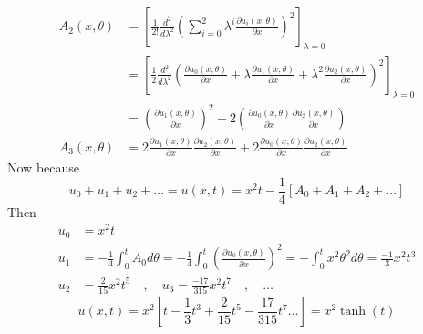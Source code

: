 \begin{example}
\begin{align*}
        \\
        A_2(x,\theta) & =\left[\frac{1}{2!} \frac{d^2}{d \lambda^2} \left(\sum_{i=0}^{2}  \lambda^i \frac{\partial u_i(x,\theta)}{\partial x}\right)^2\right]_{\lambda = 0}
        \\
                      & = \left[\frac{1}{2} \frac{d^2}{d \lambda^2} \left(\frac{\partial u_0(x,\theta)}{\partial x} + \lambda \frac{\partial u_1(x,\theta)}{\partial x} + \lambda^2 \frac{\partial u_2(x,\theta)}{\partial x}\right)^2\right]_{\lambda = 0}
        \\
                      & = \left(\frac{\partial u_1(x,\theta)}{\partial x}\right)^2 + 2 \left(\frac{\partial u_0(x,\theta)}{\partial x}\frac{\partial u_2(x,\theta)}{\partial x}\right)
        \\
        A_3(x,\theta) & = 2\frac{\partial u_1(x,\theta)}{\partial x}\frac{\partial u_2(x,\theta)}{\partial x} + 2\frac{\partial u_0(x,\theta)}{\partial x} \frac{\partial u_2(x,\theta)}{\partial x}
    \end{align*}
    Now because
    \[
        u_0 + u_1 + u_2 +\dots = u(x,t) = x^2t - \frac{1}{4}[A_0+A_1+A_2+\dots]
    \]
    Then
    \begin{align*}
        u_0 & = x^2t
        \\
        u_1 & = -\frac{1}{4}\int_{0}^{t}A_0d\theta = -\frac{1}{4}\int_{0}^{t}\left(\frac{\partial u_0(x,\theta)}{\partial x}\right)^2 = -\int_{0}^{t} x^2 \theta^2 d\theta = \frac{-1}{3}x^2t^3
        \\
        u_2 & = \frac{2}{15} x^2t^5
        \quad , \quad
        u_3 = \frac{-17}{315} x^2t^7 \quad , \quad \dots
    \end{align*}
    \[
        u(x,t) = x^2 \left[t-\frac{1}{3}t^3 + \frac{2}{15} t^5 - \frac{17}{315} t^7 \dots\right] = x^2 \tanh(t)
    \]
\end{example}

